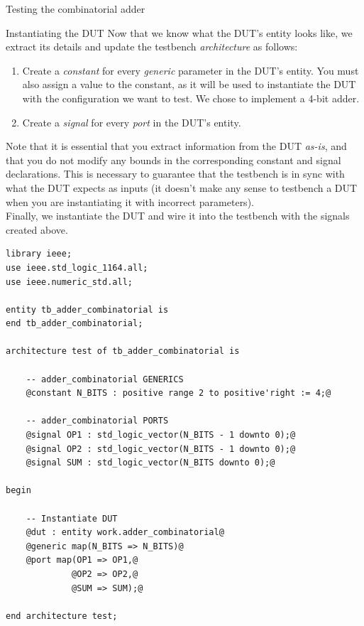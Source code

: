 \documentclass[lab]{course}
\begin{document}
\begin{section}{Testing the combinatorial adder}
\begin{subsection}{Instantiating the DUT}
        Now that we know what the DUT's entity looks like, we extract its details and update the testbench \emph{architecture} as follows:

        \begin{enumerate}
            \item Create a \emph{constant} for every \emph{generic} parameter in the DUT's entity. You must also assign a value to the constant, as it will be used to instantiate the DUT with the configuration we want to test. We chose to implement a 4-bit adder.

            \item Create a \emph{signal} for every \emph{port} in the DUT's entity.
        \end{enumerate}

        Note that it is essential that you extract information from the DUT \emph{as-is}, and that you do not modify any bounds in the corresponding constant and signal declarations. This is necessary to guarantee that the testbench is in sync with what the DUT expects as inputs (it doesn't make any sense to testbench a DUT when you are instantiating it with incorrect parameters). \\

        Finally, we instantiate the DUT and wire it into the testbench with the signals created above.

        \begin{lstlisting}[caption={Instantiate DUT}, label={lst:combinatorial_instantiate_dut}]
library ieee;
use ieee.std_logic_1164.all;
use ieee.numeric_std.all;

entity tb_adder_combinatorial is
end tb_adder_combinatorial;

architecture test of tb_adder_combinatorial is

    -- adder_combinatorial GENERICS
    @constant N_BITS : positive range 2 to positive'right := 4;@

    -- adder_combinatorial PORTS
    @signal OP1 : std_logic_vector(N_BITS - 1 downto 0);@
    @signal OP2 : std_logic_vector(N_BITS - 1 downto 0);@
    @signal SUM : std_logic_vector(N_BITS downto 0);@

begin

    -- Instantiate DUT
    @dut : entity work.adder_combinatorial@
    @generic map(N_BITS => N_BITS)@
    @port map(OP1 => OP1,@
             @OP2 => OP2,@
             @SUM => SUM);@

end architecture test;
        \end{lstlisting}
    \end{subsection}


\end{section}
\end{document}
